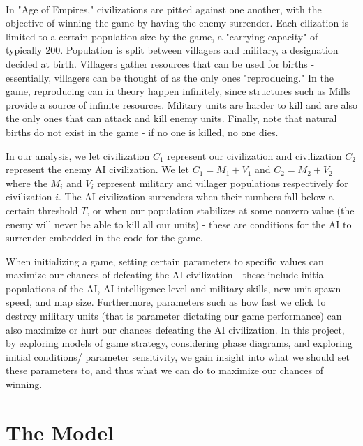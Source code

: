 \documentclass[12pt]{article}
\begin{document}
\paragraph{}
In "Age of Empires," civilizations are pitted against one another, with the objective of winning the game by having the enemy surrender. Each cilization is limited to a certain population size by the game, a "carrying capacity" of typically $200$. Population is split between villagers and military, a designation decided at birth. Villagers gather resources that can be used for births - essentially, villagers can be thought of as the only ones "reproducing." In the game, reproducing can in theory happen infinitely, since structures such as Mills provide a source of infinite resources. Military units are harder to kill and are also the only ones that can attack and kill enemy units. Finally, note that natural births do not exist in the game - if no one is killed, no one dies. \par
In our analysis, we let civilization $C_1$ represent our civilization and civilization $C_2$ represent the enemy AI civilization. We let $C_1 = M_1 + V_1$ and $C_2 = M_2 + V_2$ where the $M_i$ and $V_i$ represent military and villager populations respectively for civilization $i$. The AI civilization surrenders when their numbers fall below a certain threshold $T$, or when our population stabilizes at some nonzero value (the enemy will never be able to kill all our units) - these are conditions for the AI to surrender embedded in the code for the game. \par
When initializing a game, setting certain parameters to specific values can maximize our chances of defeating the AI civilization - these include initial populations of the AI, AI intelligence level and military skills, new unit spawn speed, and map size. Furthermore, parameters such as how fast we click to destroy military units (that is parameter dictating our game performance) can also maximize or hurt our chances defeating the AI civilization. In this project, by exploring models of game strategy, considering phase diagrams, and exploring initial conditions/ parameter sensitivity, we gain insight into what we should set these parameters to, and thus what we can do to maximize our chances of winning. \par

\section{The Model}
\end{document}
